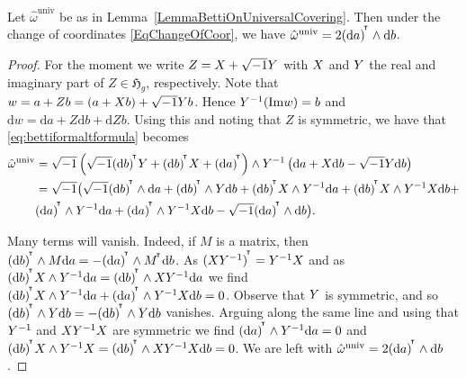 \begin{lemma}
\notready\label{LemmaBettiFormComplexReal}
Let $\hat{\omega}^{\mathrm{univ}}$ be as in
Lemma~\ref{LemmaBettiOnUniversalCovering}. Then under the change of
coordinates \eqref{EqChangeOfCoor}, we have
$\hat{\omega}^{\mathrm{univ}}=2{{(\mathrm{d}a)}}^{\!^{\intercal}} \wedge \mathrm{d}
b$.
\end{lemma}
\begin{proof} For the moment we write $Z = X + \sqrt{-1}Y$ with $X$ and $Y$ the real and
imaginary part of $Z\in\mathfrak{H}_g$, respectively.
Note that $w = a + Zb = (a + X b) + \sqrt{-1}Y b$. Hence
$Y^{-1}(\mathrm{Im}w) = b$ and $\mathrm{d}w = \mathrm{d}a +
Z\mathrm{d}b + \mathrm{d}Z  b$. Using this and noting that $Z$
is symmetric, we have that \eqref{eq:bettiformaltformula} becomes
\begin{equation*}
\begin{aligned}
    \hat \omega^{\mathrm{univ}} &=\sqrt{-1}\left( \sqrt{-1}\tran{(\rmd
        b)} \Y + \tran{(\rmd b)} \X + \tran{(\rmd a)}\right) \wedge \Y^{-1}
    \left(\rmd a + \X \rmd b - \sqrt{-1} \Y \rmd b\right) \\
    &=\sqrt{-1}\bigl(\sqrt{-1} \tran{(\rmd b)}\wedge\rmd a + \tran{(\rmd b)}\wedge
    \Y \rmd b + \tran{(\rmd b)} \X \wedge \Y^{-1} \rmd a+ \tran{(\rmd
      b)}\X\wedge
    \Y^{-1}\X \rmd b + \\
    &\tran{(\rmd a)} \wedge \Y^{-1} \rmd a
    + \tran{(\rmd a)}\wedge \Y^{-1}\X\rmd b -
    \sqrt{-1} \tran{(\rmd a)}\wedge \rmd b\bigr).
\end{aligned}
\end{equation*}

 Many terms will vanish. Indeed, if $M$ is a
matrix, then ${{(\mathrm{d} b)}}^{\!^{\intercal}} \wedge M \mathrm{d} a = - {{(\mathrm{d}
a)}}^{\!^{\intercal}}\wedge {{M}}^{\!^{\intercal}} \mathrm{d} b $. As ${{(XY^{-1})}}^{\!^{\intercal}} = Y^{-1}X$ and as
${{(\mathrm{d} b)}}^{\!^{\intercal}} X \wedge Y^{-1} \mathrm{d} a={{(\mathrm{d}
b)}}^{\!^{\intercal}} \wedge XY^{-1} \mathrm{d} a$ we find
${{(\mathrm{d} b)}}^{\!^{\intercal}}X \wedge Y^{-1} \mathrm{d} a + {{(\mathrm{d} a)}}^{\!^{\intercal}}\wedge
Y^{-1}X \mathrm{d} b=0$. Observe that $Y$ is symmetric, and so ${{(\mathrm{d}
b)}}^{\!^{\intercal}}\wedge Y \mathrm{d} b = -{{(\mathrm{d} b)}}^{\!^{\intercal}}\wedge Y\mathrm{d} b$ vanishes. Arguing
along the same line and using that
$Y^{-1}$ and $XY^{-1}X$ are  symmetric we find ${{(\mathrm{d}
a)}}^{\!^{\intercal}}\wedge Y^{-1} \mathrm{d} a = 0$ and ${{(\mathrm{d} b)}}^{\!^{\intercal}}X\wedge Y^{-1}X={{(\mathrm{d} b)}}^{\!^{\intercal}}\wedge XY^{-1}X \mathrm{d}
b=0$. We are left with
$    \hat \omega^{\mathrm{univ}} = 2{{(\mathrm{d} a)}}^{\!^{\intercal}} \wedge \mathrm{d} b$.
\end{proof}


